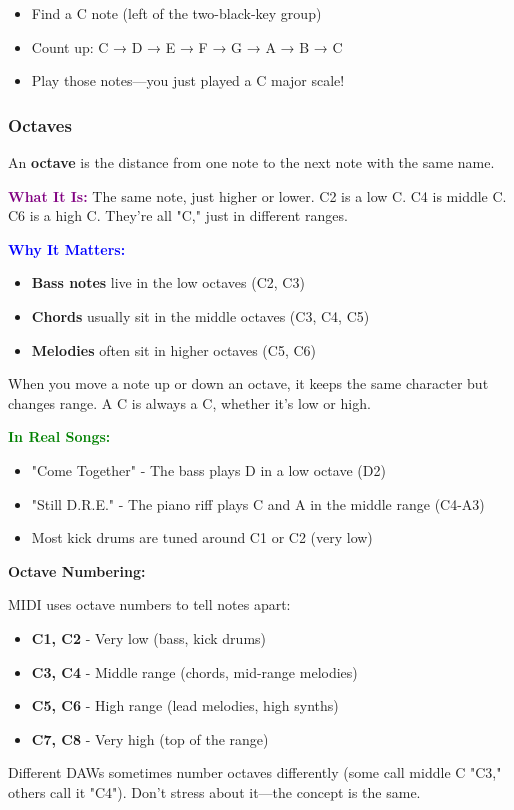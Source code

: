 \documentclass[11pt,letterpaper]{article}
\newcommand{\purple}[1]{\textcolor{purple}{\textbf{#1}}}
\newcommand{\bluepurple}[1]{\textcolor{blue}{\textbf{#1}}}
\newcommand{\greentext}[1]{\textcolor{green}{\textbf{#1}}}
\begin{document}
\begin{itemize}[leftmargin=*]
\item Find a C note (left of the two-black-key group)
\item Count up: C → D → E → F → G → A → B → C
\item Play those notes—you just played a C major scale!
\end{itemize}

\subsubsection{Octaves}

An \textbf{octave} is the distance from one note to the next note with the same name.

\textbf{\purple{What It Is:}} The same note, just higher or lower. C2 is a low C. C4 is middle C. C6 is a high C. They're all "C," just in different ranges.

\textbf{\bluepurple{Why It Matters:}} 
\begin{itemize}[leftmargin=*]
\item \textbf{Bass notes} live in the low octaves (C2, C3)
\item \textbf{Chords} usually sit in the middle octaves (C3, C4, C5)
\item \textbf{Melodies} often sit in higher octaves (C5, C6)
\end{itemize}

When you move a note up or down an octave, it keeps the same character but changes range. A C is always a C, whether it's low or high.

\textbf{\greentext{In Real Songs:}}
\begin{itemize}[leftmargin=*]
\item "Come Together" - The bass plays D in a low octave (D2)
\item "Still D.R.E." - The piano riff plays C and A in the middle range (C4-A3)
\item Most kick drums are tuned around C1 or C2 (very low)
\end{itemize}

\begin{tcolorbox}[colback=lightgray,colframe=purple,width=\textwidth,arc=3mm,boxrule=1pt]
\textbf{Octave Numbering:}

MIDI uses octave numbers to tell notes apart:
\begin{itemize}[leftmargin=*]
\item \textbf{C1, C2} - Very low (bass, kick drums)
\item \textbf{C3, C4} - Middle range (chords, mid-range melodies)
\item \textbf{C5, C6} - High range (lead melodies, high synths)
\item \textbf{C7, C8} - Very high (top of the range)
\end{itemize}

Different DAWs sometimes number octaves differently (some call middle C "C3," others call it "C4"). Don't stress about it—the concept is the same.
\end{tcolorbox}
\end{document}
